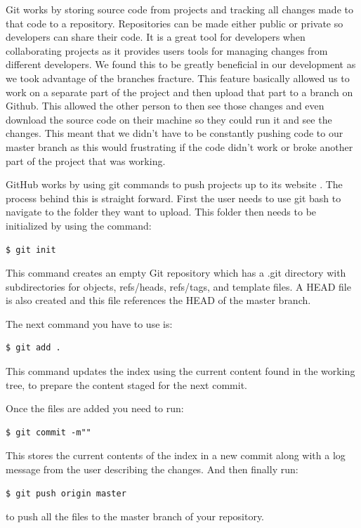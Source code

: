 Git works by storing source code from projects and tracking all changes made to that code to a repository. Repositories can be made either public or private so developers can share their code. It is a great tool for developers when collaborating projects as it provides users tools for managing changes from different developers. We found this to be greatly beneficial in our development as we took advantage of the branches fracture. This feature basically allowed us to work on a separate part of the project and then upload that part to a branch on Github. This allowed the other person to then see those changes and even download the source code on their machine so they could run it and see the changes. This meant that we didn't have to be constantly pushing code to our master branch as this would frustrating if the code didn't work or broke another part of the project that was working.

GitHub works by using git commands to push projects up to its website \cite{gitcommands}. The process behind this is straight forward. First the user needs to use git bash to navigate to the folder they want to upload. This folder then needs to be initialized by using the command:
\begin{verbatim}
$ git init
\end{verbatim}
This command creates an empty Git repository which has a .git directory with subdirectories for objects, refs/heads, refs/tags, and template files. A HEAD file is also created and this file references the HEAD of the master branch.

The next command you have to use is:

\begin{verbatim}
$ git add .
\end{verbatim}

This command updates the index using the current content found in the working tree, to prepare the content staged for the next commit. 

Once the files are added you need to run:

\begin{verbatim}
$ git commit -m""
\end{verbatim}

This stores the current contents of the index in a new commit along with a log message from the user describing the changes. And then finally run:

\begin{verbatim}
$ git push origin master
\end{verbatim}
to push all the files to the master branch of your repository.

